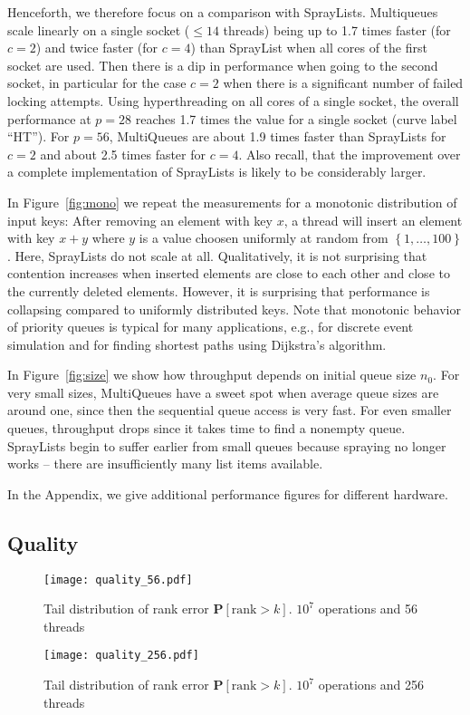 \documentclass[a4paper,12pt]{article}
\newcommand{\set}[1]{\left\{ #1\right\}}
\newcommand{\prob}[1]{{\mathbf{P}}\left[#1\right]}
\newcommand{\frage}[1]{{[\bf #1]}\marginpar{$\bigotimes$}}
\renewcommand{\frage}[1]{}
\begin{document}
Henceforth, we therefore focus on a comparison with SprayLists.
Multiqueues scale linearly on a single socket ($\leq 14$ threads) being up to 1.7 times faster (for $c=2$) and twice faster (for $c=4$) than SprayList when all cores of the first socket are used. Then there is a dip in performance when going to the second socket, in particular for the case $c=2$ when there is a significant number of failed locking attempts. Using hyperthreading on all cores of a single socket, the overall performance at $p=28$ reaches 1.7 times the value for a single socket (curve label ``HT'').
For $p=56$, MultiQueues are about 1.9 times faster than SprayLists for $c=2$ and about 2.5 times faster for $c=4$. Also recall, that the improvement over a complete implementation of SprayLists is likely to be considerably larger.


\frage{todo: put tic marks on all axes of figures.}
In Figure~\ref{fig:mono} we repeat the measurements for a monotonic distribution of input keys:
After removing an element with key $x$, a thread will insert an element with key $x+y$ where $y$ is a value choosen uniformly at random from $\set{1,\ldots,100}$. Here, SprayLists do not scale at all. Qualitatively, 
it is not surprising that contention increases when inserted elements are close to each other and close to the currently deleted elements. However, it is surprising that performance is collapsing compared to uniformly distributed keys. Note that monotonic behavior of priority queues is typical for many applications, e.g., for discrete event simulation and for finding shortest paths using Dijkstra's algorithm.

In Figure~\ref{fig:size} we show how throughput depends on initial queue size $n_0$. 
For very small sizes, MultiQueues have a sweet spot when average queue sizes are around one, since then the sequential queue access is very fast. For even smaller queues, throughput drops since it takes time to find a nonempty queue. 
SprayLists begin to suffer earlier from small queues  because spraying no longer works -- there are insufficiently many list items available. 

In the Appendix, we give additional performance figures for different hardware.
\subsection{Quality}
\begin{figure}[h]
\centering\texttt{[image: quality\_56.pdf]}
\caption{Tail distribution of rank error $\prob{\mathrm{rank}>k}$. $10^7$ operations and 56 threads}
\label{fig:quality}
\end{figure}
\begin{figure}[h]
\centering\texttt{[image: quality\_256.pdf]}
\caption{Tail distribution of rank error $\prob{\mathrm{rank}>k}$. $10^7$ operations and 256 threads}
\label{fig:quality256}
\end{figure}
\end{document}
